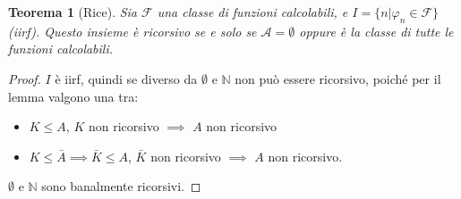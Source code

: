 \documentclass[a4paper,10pt,oneside]{article}
\theoremstyle{break}
\newtheorem{teo}{Teorema}[subsection]
\newcommand{\naturals}{\mathbb {N}}
\begin{document}
\begin{mdframed}
 \begin{teo}[Rice]
  Sia $\mathcal F$ una classe di funzioni calcolabili, e $I = \{ n | \varphi_n \in \mathcal F \}$ (iirf). Questo insieme è ricorsivo se e solo se $\mathcal{A} = \emptyset$ oppure è la classe di tutte le funzioni calcolabili.
 \end{teo}
 \begin{proof}
  $I$ è iirf, quindi se diverso da $\emptyset$ e $\naturals$ non può essere ricorsivo, poiché per il lemma valgono una tra:
  \begin{itemize}
   \item $K \leq A$, $K$ non ricorsivo $\implies$ $A$ non ricorsivo
   \item $K \leq \bar A \implies \bar K \leq A$, $\bar K$ non ricorsivo $\implies$ $A$ non ricorsivo.
  \end{itemize}
  
  $\emptyset$ e $\naturals$ sono banalmente ricorsivi.

 \end{proof}

\end{mdframed}
\end{document}
